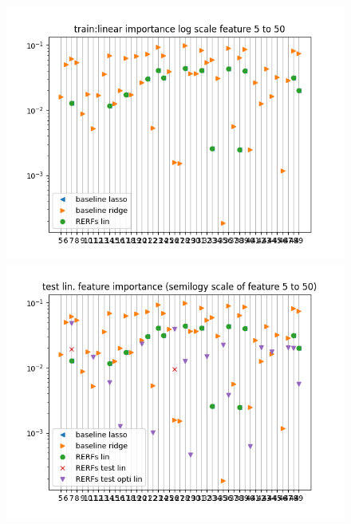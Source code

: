 \documentclass{article}
\begin{document}
\begin{figure}
\includegraphics[scale=0.7]{train_linear_feature_importance2.png}

\includegraphics[scale=0.7]{test_linear_feature_importance2.png}
\end{figure}
\end{document}
